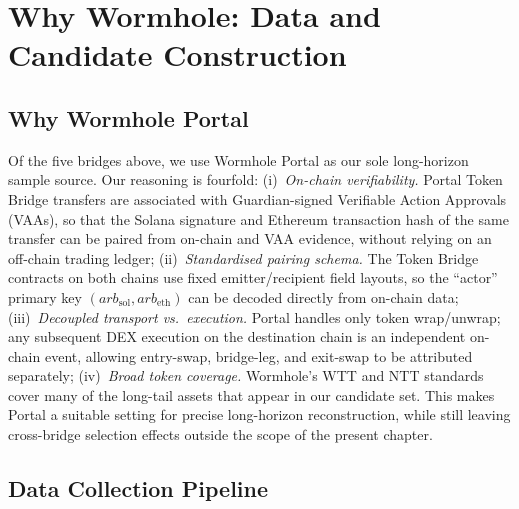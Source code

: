 \documentclass[sigconf,nonacm,10pt]{acmart}
\begin{document}
\section{Why Wormhole: Data and Candidate Construction}
\label{sec:data}

\subsection{Why Wormhole Portal}

Of the five bridges above, we use Wormhole Portal as our sole
long-horizon sample source. Our reasoning is fourfold:
(i)~\emph{On-chain verifiability.} Portal Token Bridge transfers are
associated with Guardian-signed Verifiable Action Approvals (VAAs),
so that the Solana signature and Ethereum transaction hash of the
same transfer can be paired from on-chain and VAA evidence, without
relying on an off-chain trading ledger;
(ii)~\emph{Standardised pairing schema.} The Token Bridge contracts
on both chains use fixed emitter/recipient field layouts, so the
``actor'' primary key
$(arb_{\mathrm{sol}}, arb_{\mathrm{eth}})$ can be decoded directly
from on-chain data;
(iii)~\emph{Decoupled transport vs.\ execution.} Portal handles only
token wrap/unwrap; any subsequent DEX execution on the destination
chain is an independent on-chain event, allowing entry-swap,
bridge-leg, and exit-swap to be attributed separately;
(iv)~\emph{Broad token coverage.} Wormhole's WTT and NTT standards
cover many of the long-tail assets that appear in our candidate set.
This makes Portal a suitable setting for precise long-horizon
reconstruction, while still leaving cross-bridge selection effects
outside the scope of the present chapter.

\subsection{Data Collection Pipeline}
\label{sec:pipeline}
\end{document}
